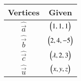 \begin{tabular}[12pt]{ |c| c|}
    \hline
    \textbf{Vertices} & \textbf{Given}\\ 
    \hline
     $\hat{\vec{a}}$ & $\begin{pmatrix}1,1,1\end{pmatrix}$ \\
    \hline 
     $\hat{\vec{b}}$ & $\begin{pmatrix}2,4,-5\end{pmatrix}$\\
    \hline
     $\hat{\vec{c}}$& $\begin{pmatrix}\lambda,2,3\end{pmatrix}$\\
    \hline
     $\hat{\vec{u}}$& $\begin{pmatrix}x,y,z\end{pmatrix}$\\
    \hline   
    \end{tabular}
